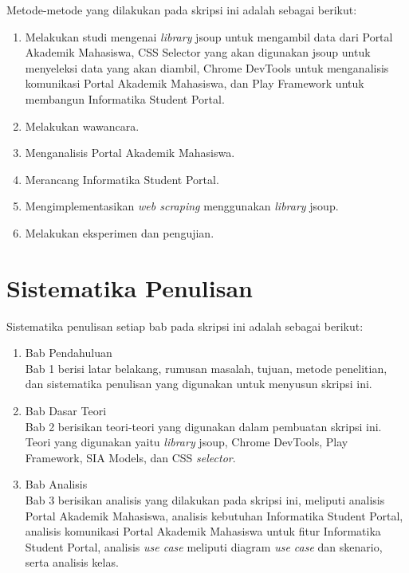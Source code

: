 Metode-metode yang dilakukan pada skripsi ini adalah sebagai berikut:

\begin{enumerate}
	\item Melakukan studi mengenai \textit{library} jsoup untuk mengambil data dari Portal Akademik Mahasiswa, CSS Selector yang akan digunakan jsoup untuk menyeleksi data yang akan diambil, Chrome DevTools untuk menganalisis komunikasi Portal Akademik Mahasiswa, dan Play Framework untuk membangun Informatika Student Portal.
	\item Melakukan wawancara.
	\item Menganalisis Portal Akademik Mahasiswa.
	\item Merancang Informatika Student Portal.
	\item Mengimplementasikan \textit{web scraping} menggunakan \textit{library} jsoup.
	\item Melakukan eksperimen dan pengujian.
\end{enumerate}

\section{Sistematika Penulisan}
\label{sec:sistematika_penulisan}

Sistematika penulisan setiap bab pada skripsi ini adalah sebagai berikut:

\begin{enumerate}
  \item Bab Pendahuluan \\
  Bab 1 berisi latar belakang, rumusan masalah, tujuan, metode penelitian,
  dan sistematika penulisan yang digunakan untuk menyusun skripsi ini.
  \item Bab Dasar Teori \\
  Bab 2 berisikan teori-teori yang digunakan dalam pembuatan skripsi ini. Teori
  yang digunakan yaitu \textit{library} jsoup, Chrome DevTools, Play Framework, SIA Models, dan CSS \textit{selector}.
  \item Bab Analisis \\
  Bab 3 berisikan analisis yang dilakukan pada skripsi ini, meliputi analisis Portal Akademik Mahasiswa, analisis kebutuhan Informatika Student Portal, analisis komunikasi Portal Akademik Mahasiswa untuk fitur Informatika Student Portal, analisis \textit{use case} meliputi diagram \textsl{use case} dan skenario, serta analisis kelas. 
\end{enumerate}
